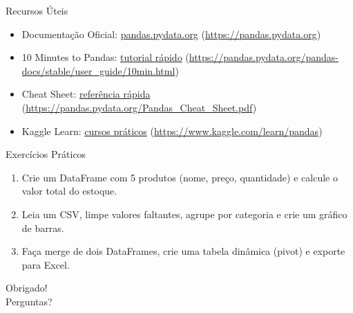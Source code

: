 \documentclass[aspectratio=169]{beamer}
\begin{document}
\begin{frame}{Recursos Úteis}
  \small
  \begin{itemize}
    \item Documentação Oficial: \href{https://pandas.pydata.org}{pandas.pydata.org} (\url{https://pandas.pydata.org})
    \item 10 Minutes to Pandas: \href{https://pandas.pydata.org/pandas-docs/stable/user_guide/10min.html}{tutorial rápido} (\url{https://pandas.pydata.org/pandas-docs/stable/user_guide/10min.html})
    \item Cheat Sheet: \href{https://pandas.pydata.org/Pandas_Cheat_Sheet.pdf}{referência rápida} (\url{https://pandas.pydata.org/Pandas_Cheat_Sheet.pdf})
    \item Kaggle Learn: \href{https://www.kaggle.com/learn/pandas}{cursos práticos} (\url{https://www.kaggle.com/learn/pandas})
  \end{itemize}
\end{frame}

\begin{frame}{Exercícios Práticos}
  \begin{enumerate}
    \item Crie um DataFrame com 5 produtos (nome, preço, quantidade) e calcule o valor total do estoque.
    \item Leia um CSV, limpe valores faltantes, agrupe por categoria e crie um gráfico de barras.
    \item Faça merge de dois DataFrames, crie uma tabela dinâmica (pivot) e exporte para Excel.
  \end{enumerate}
\end{frame}

\begin{frame}
  \centering
  \Large Obrigado! \\
  \vspace{0.5em}
  \normalsize Perguntas?
\end{frame}
\end{document}

